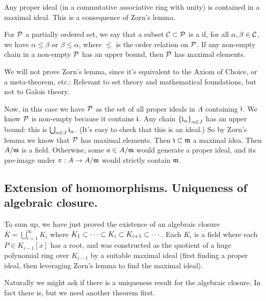 \begin{rmk}
Any proper ideal (in a commutative associative ring with unity) is contained in a maximal ideal. This is a consequence of Zorn's lemma.
\end{rmk}
\begin{lem}[Zorn]
For $\mathcal{P}$ a partially ordered set, we say that a subset $\mathcal{C} \subset \mathcal{P}$ is a  if, for all $\alpha, \beta \in \mathcal{C}$, we have $\alpha \leq \beta$ or $\beta \leq \alpha$, where $\leq$ is the order relation on $\mathcal{P}$. If any non-empty chain in a non-empty $\mathcal{P}$ has an upper bound, then $\mathcal{P}$ has maximal elements.
\end{lem}
We will not prove Zorn's lemma, since it's equivalent to the Axiom of Choice, or a meta-theorem, etc.: Relevant to set theory and mathematical foundations, but not to Galois theory.

Now, in this case we have $\mathcal{P}$ as the set of all proper ideals in $A$ containing $\mathfrak{i}$. We know $\mathcal{P}$ is non-empty because it contains $\mathfrak{i}$. Any chain $\left\{\mathfrak{i}_\alpha\right\}_{\alpha \in J}$ has an upper bound: this is $\bigcup_{\alpha \in J} \mathfrak{i}_\alpha$. (It's easy to check that this is an ideal.) So by Zorn's lemma we know that $\mathcal{P}$ has maximal elements. Then $\mathfrak{i} \subset \mathfrak{m}$ a maximal idea. Then $A / \mathfrak{m}$ is a field. Otherwise, some $a \in A / \mathfrak{m}$ would generate a proper ideal, and its pre-image under $\pi: A \to A / \mathfrak{m}$ would strictly contain $\mathfrak{m}$.

\subsection{Extension of homomorphisms. Uniqueness of algebraic closure.}

To sum up, we have just proved the existence of an algebraic closure $\bar{K} = \bigcup_{i = 1}^{\infty} K_i$ where $K_1 \subset \dotsb \subset K_i \subset K_{i+1} \subset \dotsb$. Each $K_i$ is a field where each $P \in K_{i-1}[x]$ has a root, and was constructed as the quotient of a huge polynomial ring over $K_{i-1}$ by a suitable maximal ideal (first finding a proper ideal, then leveraging Zorn's lemma to find the maximal ideal).

Naturally we might ask if there is a uniqueness result for the algebraic closure. In fact there is, but we need another theorem first.

